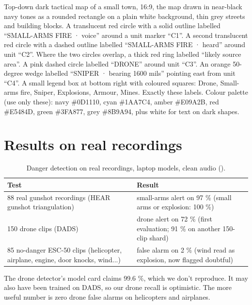 {Top-down dark tactical map of a small town, 16:9, the map drawn in near-black navy tones as a rounded rectangle on a plain white background, thin grey streets and building blocks.
A translucent red circle with a solid outline labelled ``SMALL-ARMS FIRE · voice'' around a unit marker ``C1''. A
second translucent red circle with a dashed outline labelled ``SMALL-ARMS FIRE · heard'' around unit ``C2''. Where the
two circles overlap, a thick red ring labelled ``likely source area''. A pink dashed circle labelled ``DRONE'' around unit
``C3''. An orange 50-degree wedge labelled ``SNIPER · bearing 1600 mils'' pointing east from unit ``C4''. A small legend
box at bottom right with coloured squares: Drone, Small-arms fire, Sniper, Explosions, Armour, Mines. Exactly these labels. Colour palette (use only these): navy \#0D1110, cyan \#1AA7C4, amber \#E09A2B, red \#E5484D, green \#3FA877, grey \#8B9A94, plus white for text on dark shapes.}

\section{Results on real recordings}

\begin{table}[htbp]\centering\small
\caption{Danger detection on real recordings, laptop models, clean audio ().}\label{tab:dangereval}
\begin{tabularx}{\linewidth}{Xl}
\toprule
Test & Result\\
\midrule
88 real gunshot recordings (HEAR gunshot triangulation) & small-arms alert on 97 \% (small arms or explosion: 100 \%)\\
150 drone clips (DADS) & drone alert on 72 \% (first evaluation; 91 \% on another 150-clip shard)\\
85 no-danger ESC-50 clips (helicopter, airplane, engine, door knocks, wind...) & false alarm on 2 \% (wind read as explosion, now flagged doubtful)\\
\bottomrule
\end{tabularx}
\end{table}

The drone detector's model card claims 99.6 \%, which we don't reproduce. It may also have been trained on DADS, so
our drone recall is optimistic. The more useful number is zero drone false alarms on helicopters and airplanes.
